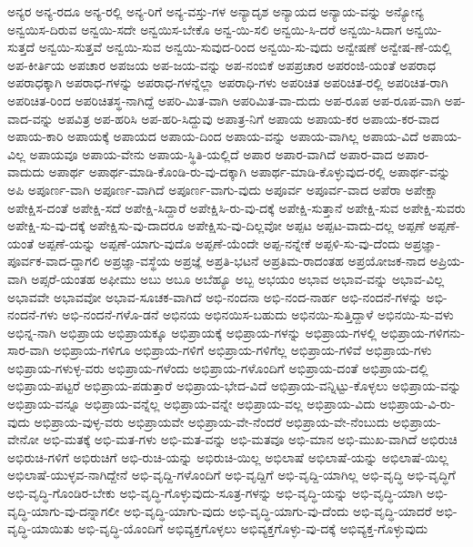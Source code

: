 {ಅನ್ಯರ
ಅನ್ಯ-ರದೂ
ಅನ್ಯ-ರಲ್ಲಿ
ಅನ್ಯ-ರಿಗೆ
ಅನ್ಯ-ವಸ್ತು-ಗಳ
ಅನ್ಯಾದೃಶ
ಅನ್ಯಾಯದ
ಅನ್ಯಾಯ-ವನ್ನು
ಅನ್ಯೋನ್ಯ
ಅನ್ವಯಿಸ-ದಿರುವ
ಅನ್ವಯಿ-ಸದೇ
ಅನ್ವಯಿಸ-ಬೇಕೊ
ಅನ್ವ-ಯಿ-ಸಲಿ
ಅನ್ವಯಿ-ಸಿ-ದರೆ
ಅನ್ವಯಿ-ಸಿದಾಗ
ಅನ್ವಯಿ-ಸುತ್ತದೆ
ಅನ್ವಯಿ-ಸುತ್ತವೆ
ಅನ್ವಯಿ-ಸುವ
ಅನ್ವಯಿ-ಸುವುದ-ರಿಂದ
ಅನ್ವಯಿ-ಸು-ವುದು
ಅನ್ವೇಷಣೆ
ಅನ್ವೇಷ-ಣೆ-ಯಲ್ಲಿ
ಅಪ-ಕೀರ್ತಿಯ
ಅಪಚಾರ
ಅಪಜಯ
ಅಪ-ಜಯ-ವನ್ನು
ಅಪ-ನಂಬಿಕೆ
ಅಪಪ್ರಚಾರ
ಅಪರಂಜಿ-ಯಂತೆ
ಅಪರಾಧ
ಅಪರಾಧಕ್ಕಾಗಿ
ಅಪರಾಧ-ಗಳನ್ನು
ಅಪರಾಧ-ಗಳನ್ನೆಲ್ಲಾ
ಅಪರಾಧಿ-ಗಳು
ಅಪರಿಚಿತ
ಅಪರಿಚಿತ-ರಲ್ಲಿ
ಅಪರಿಚಿತ-ರಾಗಿ
ಅಪರಿಚಿತ-ರಿಂದ
ಅಪರಿಚಿತಸ್ಥ-ನಾಗಿದ್ದೆ
ಅಪರಿ-ಮಿತ-ವಾಗಿ
ಅಪರಿಮಿತ-ವಾ-ದುದು
ಅಪ-ರೂಪ
ಅಪ-ರೂಪ-ವಾಗಿ
ಅಪ-ವಾದ-ವನ್ನು
ಅಪವಿತ್ರ
ಅಪ-ಹರಿಸಿ
ಅಪ-ಹರಿ-ಸಿದ್ದುವು
ಅಪಾತ್ರ-ನಿಗೆ
ಅಪಾಯ
ಅಪಾಯ-ಕರ
ಅಪಾಯ-ಕರ-ವಾದ
ಅಪಾಯ-ಕಾರಿ
ಅಪಾಯಕ್ಕೆ
ಅಪಾಯದ
ಅಪಾಯ-ದಿಂದ
ಅಪಾಯ-ವನ್ನು
ಅಪಾಯ-ವಾಗಿಲ್ಲ
ಅಪಾಯ-ವಿದೆ
ಅಪಾಯ-ವಿಲ್ಲ
ಅಪಾಯವೂ
ಅಪಾಯ-ವೇನು
ಅಪಾಯ-ಸ್ಥಿತಿ-ಯಲ್ಲಿದೆ
ಅಪಾರ
ಅಪಾರ-ವಾಗಿದೆ
ಅಪಾರ-ವಾದ
ಅಪಾರ-ವಾದುದು
ಅಪಾರ್ಥ
ಅಪಾರ್ಥ-ಮಾಡಿ-ಕೊಂಡಿ-ರು-ವು-ದಕ್ಕಾಗಿ
ಅಪಾರ್ಥ-ಮಾಡಿ-ಕೊಳ್ಳುವುದ-ರಲ್ಲಿ
ಅಪಾರ್ಥ-ವನ್ನು
ಅಪಿ
ಅಪೂರ್ಣ-ವಾಗಿ
ಅಪೂರ್ಣ-ವಾಗಿದೆ
ಅಪೂರ್ಣ-ವಾಗು-ವುದು
ಅಪೂರ್ವ
ಅಪೂರ್ವ-ವಾದ
ಅಪೆರಾ
ಅಪೇಕ್ಷಾ
ಅಪೇಕ್ಷಿಸ-ದಂತೆ
ಅಪೇಕ್ಷಿ-ಸದೆ
ಅಪೇಕ್ಷಿ-ಸಿದ್ದಾರೆ
ಅಪೇಕ್ಷಿಸಿ-ರು-ವು-ದಕ್ಕೆ
ಅಪೇಕ್ಷಿ-ಸುತ್ತಾನೆ
ಅಪೇಕ್ಷಿ-ಸುವ
ಅಪೇಕ್ಷಿ-ಸುವರು
ಅಪೇಕ್ಷಿ-ಸು-ವು-ದಕ್ಕೆ
ಅಪೇಕ್ಷಿಸು-ವು-ದಾದರೂ
ಅಪೇಕ್ಷಿಸು-ವು-ದಿಲ್ಲವೋ
ಅಪ್ಪಟ
ಅಪ್ಪಟ-ವಾದು-ದಲ್ಲ
ಅಪ್ಪಣೆ
ಅಪ್ಪಣೆ-ಯಂತೆ
ಅಪ್ಪಣೆ-ಯನ್ನು
ಅಪ್ಪಣೆ-ಯಾಗು-ವುದೊ
ಅಪ್ಪಣೆ-ಯೆಂದೇ
ಅಪ್ಪ-ನನ್ನೇಕೆ
ಅಪ್ಪಳಿ-ಸು-ವು-ದೆಂದು
ಅಪ್ರಜ್ಞಾ-ಪೂರ್ವಕ-ವಾದ-ದ್ದಾಗಲಿ
ಅಪ್ರಜ್ಞಾ-ವಸ್ಥೆಯ
ಅಪ್ರಜ್ಞೆ
ಅಪ್ರತಿ-ಭಟನೆ
ಅಪ್ರತಿಮ-ರಾದಂತಹ
ಅಪ್ರಯೋಜಕ-ನಾದ
ಅಪ್ರಿಯ-ವಾಗಿ
ಅಪ್ಸರೆ-ಯಂತಹ
ಅಫೀಮು
ಅಬು
ಅಬೂ
ಅಬೆಹ್ಯೂ
ಅಬ್ಬ
ಅಭಯಂ
ಅಭಾವ
ಅಭಾವ-ವನ್ನು
ಅಭಾವ-ವಿಲ್ಲ
ಅಭಾವವೇ
ಅಭಾವವೋ
ಅಭಾವ-ಸೂಚಕ-ವಾಗಿದೆ
ಅಭಿ-ನಂದನಾ
ಅಭಿ-ನಂದ-ನಾರ್ಹ
ಅಭಿ-ನಂದನೆ-ಗಳನ್ನು
ಅಭಿ-ನಂದನೆ-ಗಳು
ಅಭಿ-ನಂದನೆ-ಗಳೊ-ಡನೆ
ಅಭಿನಯ
ಅಭಿನಯಿಸ-ಬಹುದು
ಅಭಿನಯಿ-ಸುತ್ತಿದ್ದಾಳೆ
ಅಭಿನಯಿ-ಸು-ವಳು
ಅಭಿನ್ನ-ನಾಗಿ
ಅಭಿಪ್ರಾಯ
ಅಭಿಪ್ರಾಯಕ್ಕೂ
ಅಭಿಪ್ರಾಯಕ್ಕೆ
ಅಭಿಪ್ರಾಯ-ಗಳನ್ನು
ಅಭಿಪ್ರಾಯ-ಗಳಲ್ಲಿ
ಅಭಿಪ್ರಾಯ-ಗಳಿಗನು-ಸಾರ-ವಾಗಿ
ಅಭಿಪ್ರಾಯ-ಗಳಿಗೂ
ಅಭಿಪ್ರಾಯ-ಗಳಿಗೆ
ಅಭಿಪ್ರಾಯ-ಗಳಿಗೆಲ್ಲ
ಅಭಿಪ್ರಾಯ-ಗಳಿವೆ
ಅಭಿಪ್ರಾಯ-ಗಳು
ಅಭಿಪ್ರಾಯ-ಗಳುಳ್ಳ-ವರು
ಅಭಿಪ್ರಾಯ-ಗಳೆಂದು
ಅಭಿಪ್ರಾಯ-ಗಳೊಂದಿಗೆ
ಅಭಿಪ್ರಾಯ-ದಂತೆ
ಅಭಿಪ್ರಾಯ-ದಲ್ಲಿ
ಅಭಿಪ್ರಾಯ-ಪಟ್ಟರೆ
ಅಭಿಪ್ರಾಯ-ಪಡುತ್ತಾರೆ
ಅಭಿಪ್ರಾಯ-ಭೇದ-ವಿದೆ
ಅಭಿಪ್ರಾಯ-ವನ್ನಿಟ್ಟು-ಕೊಳ್ಳಲು
ಅಭಿಪ್ರಾಯ-ವನ್ನು
ಅಭಿಪ್ರಾಯ-ವನ್ನೂ
ಅಭಿಪ್ರಾಯ-ವನ್ನೆಲ್ಲ
ಅಭಿಪ್ರಾಯ-ವನ್ನೇ
ಅಭಿಪ್ರಾಯ-ವಲ್ಲ
ಅಭಿಪ್ರಾಯ-ವಿದು
ಅಭಿಪ್ರಾಯ-ವಿ-ರು-ವುದು
ಅಭಿಪ್ರಾಯ-ವುಳ್ಳ-ವರು
ಅಭಿಪ್ರಾಯವೇ
ಅಭಿಪ್ರಾಯ-ವೇ-ನೆಂದರೆ
ಅಭಿಪ್ರಾಯ-ವೇ-ನೆಂಬುದು
ಅಭಿಪ್ರಾಯ-ವೇನೋ
ಅಭಿ-ಮತಕ್ಕೆ
ಅಭಿ-ಮತ-ಗಳು
ಅಭಿ-ಮತ-ವನ್ನು
ಅಭಿ-ಮತವೂ
ಅಭಿ-ಮಾನ
ಅಭಿ-ಮುಖ-ವಾಗಿದೆ
ಅಭಿರುಚಿ
ಅಭಿರುಚಿ-ಗಳಿಗೆ
ಅಭಿರುಚಿಗೆ
ಅಭಿ-ರುಚಿ-ಯನ್ನು
ಅಭಿರುಚಿ-ಯಿಲ್ಲ
ಅಭಿಲಾಷೆ
ಅಭಿಲಾಷೆ-ಯನ್ನು
ಅಭಿಲಾಷೆ-ಯಿಲ್ಲ
ಅಭಿಲಾಷೆ-ಯುಳ್ಳವ-ನಾಗಿದ್ದೇನೆ
ಅಭಿ-ವೃದ್ದಿ-ಗಳೊಂದಿಗೆ
ಅಭಿ-ವೃದ್ದಿಗೆ
ಅಭಿ-ವೃದ್ದಿ-ಯಾಗಿಲ್ಲ
ಅಭಿ-ವೃದ್ಧಿ
ಅಭಿ-ವೃದ್ಧಿಗೆ
ಅಭಿ-ವೃದ್ಧಿ-ಗೊಂಡಿರ-ಬೇಕು
ಅಭಿ-ವೃದ್ಧಿ-ಗೊಳ್ಳುವುದು-ಸೂತ್ರ-ಗಳನ್ನು
ಅಭಿ-ವೃದ್ಧಿ-ಯನ್ನು
ಅಭಿ-ವೃದ್ಧಿ-ಯಾಗಿ
ಅಭಿ-ವೃದ್ಧಿ-ಯಾಗು-ವು-ದನ್ನಾಗಲೀ
ಅಭಿ-ವೃದ್ಧಿ-ಯಾಗು-ವುದು
ಅಭಿ-ವೃದ್ಧಿ-ಯಾಗು-ವು-ದೆಂದು
ಅಭಿ-ವೃದ್ಧಿ-ಯಾದರೆ
ಅಭಿ-ವೃದ್ಧಿ-ಯಾಯಿತು
ಅಭಿ-ವೃದ್ಧಿ-ಯೊಂದಿಗೆ
ಅಭಿವ್ಯಕ್ತಗೊಳ್ಳಲು
ಅಭಿವ್ಯಕ್ತಗೊಳ್ಳು-ವು-ದಕ್ಕೆ
ಅಭಿವ್ಯಕ್ತ-ಗೊಳ್ಳುವುದು
}
